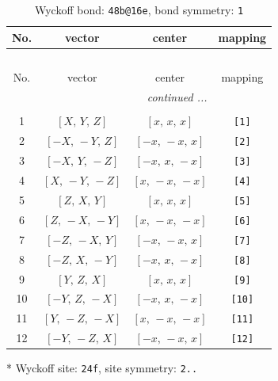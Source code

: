\documentclass[fleqn,8pt]{jsarticle}
\begin{document}
\begin{longtable}{cccc}
\caption{Wyckoff bond: {\tt 48b@16e}, bond symmetry: {\tt 1}}
 \\
 \hline \hline
No. & vector & center & mapping \\ \hline \endfirsthead

\multicolumn{3}{l}{\tablename\ \thetable{}} \\
 \hline \hline
No. & vector & center & mapping \\ \hline \endhead

 \hline \hline
\multicolumn{3}{r}{\footnotesize\it continued ...} \\ \endfoot

 \hline \hline
\multicolumn{3}{r}{} \\ \endlastfoot

1 & $\left[ X,\, Y,\, Z \right]$ & $\left[ x,\, x,\, x \right]$ & {\tt [1]} \\ \hline
2 & $\left[ - X,\, - Y,\, Z \right]$ & $\left[ - x,\, - x,\, x \right]$ & {\tt [2]} \\ \hline
3 & $\left[ - X,\, Y,\, - Z \right]$ & $\left[ - x,\, x,\, - x \right]$ & {\tt [3]} \\ \hline
4 & $\left[ X,\, - Y,\, - Z \right]$ & $\left[ x,\, - x,\, - x \right]$ & {\tt [4]} \\ \hline
5 & $\left[ Z,\, X,\, Y \right]$ & $\left[ x,\, x,\, x \right]$ & {\tt [5]} \\ \hline
6 & $\left[ Z,\, - X,\, - Y \right]$ & $\left[ x,\, - x,\, - x \right]$ & {\tt [6]} \\ \hline
7 & $\left[ - Z,\, - X,\, Y \right]$ & $\left[ - x,\, - x,\, x \right]$ & {\tt [7]} \\ \hline
8 & $\left[ - Z,\, X,\, - Y \right]$ & $\left[ - x,\, x,\, - x \right]$ & {\tt [8]} \\ \hline
9 & $\left[ Y,\, Z,\, X \right]$ & $\left[ x,\, x,\, x \right]$ & {\tt [9]} \\ \hline
10 & $\left[ - Y,\, Z,\, - X \right]$ & $\left[ - x,\, x,\, - x \right]$ & {\tt [10]} \\ \hline
11 & $\left[ Y,\, - Z,\, - X \right]$ & $\left[ x,\, - x,\, - x \right]$ & {\tt [11]} \\ \hline
12 & $\left[ - Y,\, - Z,\, X \right]$ & $\left[ - x,\, - x,\, x \right]$ & {\tt [12]} \\
\end{longtable}
* Wyckoff site: {\tt 24f}, site symmetry: {\tt 2..}
\renewcommand{\arraystretch}{1.2}
\end{document}

